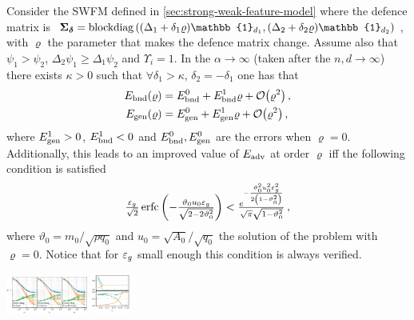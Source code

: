 \documentclass[a0paper,fleqn]{betterportraitposter}
\theoremstyle{plain}
\theoremstyle{definition}
\theoremstyle{remark}
\begin{document}
{\begin{multicols}{3}
Consider the SWFM defined in \cref{sec:strong-weak-feature-model}
where the defence matrix is 
\(
    \Sigmadelta = \operatorname{blockdiag}\qty( 
        (\Delta_1 + \delta_1 \varrho ) \mathbb{1}_{d_1}, (\Delta_2 + \delta_2 \varrho ) \mathbb{1}_{d_2} 
    )
\), 
with \(\varrho\) the parameter that makes the defence matrix change.
Assume also that \(\psi_1 > \psi_2\), \(\Delta_2 \psi_1 \geq \Delta_1 \psi_2\) and \(\Upsilon_i = 1\).
In the \(\alpha\to \infty\) (taken after the \(n,d\to\infty\)) there exists \(\kappa > 0\) such that \(\forall \delta_1 > \kappa\), \(\delta_2 = -\delta_1\) one has that
\begin{equation}
\begin{aligned}
    \bounderr(\varrho) &= \bounderr^0 + \bounderr^1 \varrho + \order{\varrho^2} \,, \\
    \generr(\varrho) &= \generr^0 + \generr^1 \varrho + \order{\varrho^2} \,,
\end{aligned}
\end{equation}
where \(E_{\mathrm{gen}}^1 > 0\), \(E_{\mathrm{bnd}}^1 < 0\) and \(E_{\mathrm{bnd}}^0,E_{\mathrm{gen}}^0\) are the errors when \(\varrho =0\).
Additionally, this leads to an improved value of \(E_{\mathrm{adv}}\) at order \(\varrho\) iff the following condition is satisfied
\vspace{-5pt}
\begin{equation}
    {\textstyle
        \frac{\ensuremath{\varepsilon_g}}{\sqrt{2}}
        \operatorname*{erfc}\qty( -\frac{\vartheta_0 u_0 \ensuremath{\varepsilon_g}}{ \sqrt{2-2 \vartheta_0 ^2} }) 
        < \frac{e^{-\frac{\vartheta_0^2 u_0^2 \ensuremath{\varepsilon_g}^2}{2 \left(1-\vartheta_0 ^2\right) } }}{\sqrt{\pi} \sqrt{1-\vartheta_0^2}} \,,
    }
\end{equation}
where \(\vartheta_0 = m_0 / \sqrt{\rho q_0}\) and \(u_0 = \sqrt{A_0} / \sqrt{q_0}\) the solution of the problem with \(\varrho = 0\). 
Notice that for \(\varepsilon_g\) small enough this condition is always verified.

\begin{center}
    \includegraphics[width=0.2\textwidth]{Assets/defence_sweep.pdf}
    \includegraphics[width=0.1\textwidth]{Assets/optimal_defense.pdf}
\end{center}




\end{multicols}}
\end{document}

